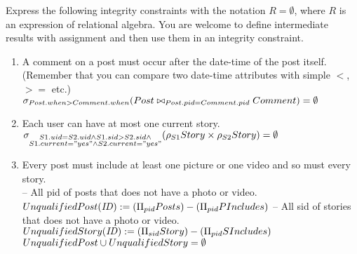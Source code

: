 \documentclass{article}
\newcommand{\var}[1]{\mathit{#1}}
\begin{document}
Express the following integrity constraints
with the notation $R = \emptyset$, where $R$ is an expression of relational algebra. 
You are welcome to define intermediate results with assignment
and then use them in an integrity constraint.

\begin{enumerate}

\item   %
A comment on a post must occur after the date-time of the post itself.
(Remember that you can compare two date-time attributes with simple $<$,
$>=$ etc.) \\

{\large
$
	\sigma_{Post.when > Comment.when}
	(Post \bowtie_{Post.pid = Comment.pid} Comment) = \emptyset \\[10pt]
$
}

\item %
Each user can have at most one current story. \\

{\large
$	
	\sigma_{\substack{S1.uid = S2.uid \wedge S1.sid > S2.sid \wedge \\ S1.current = "yes" \wedge S2.current = "yes"}}
	(\rho_{S1} Story \times \rho_{S2} Story) = \emptyset \\[10pt]
$
}

\item %
Every post must include at least one picture or one video and so must every story. \\

{\large
-- All pid of posts that does not have a photo or video. \\[5pt]
$
UnqualifiedPost(\var{ID}) := 
	(\Pi_{pid} Posts) - (\Pi_{pid} PIncludes) \\[10pt]
$	
-- All sid of stories that does not have a photo or video. \\[5pt]
$
UnqualifiedStory(\var{ID}) := 
	(\Pi_{sid} Story) - (\Pi_{pid} SIncludes) \\[10pt]
$
$
UnqualifiedPost \cup UnqualifiedStory = \emptyset \\[10pt]
$
}

\end{enumerate}
\end{document}
